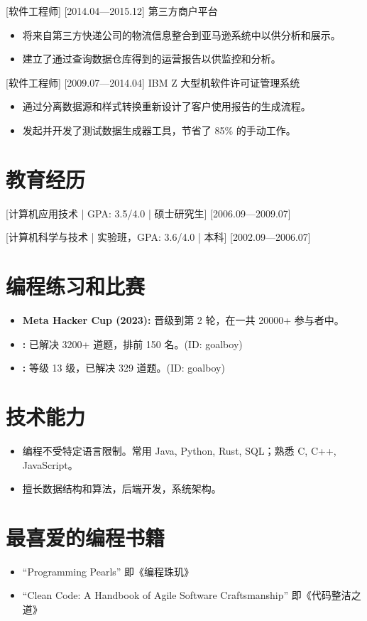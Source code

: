 \documentclass{resume}
\begin{document}
[软件工程师]
[2014.04—2015.12]
第三方商户平台
\begin{itemize}
  \item 将来自第三方快递公司的物流信息整合到亚马逊系统中以供分析和展示。
  \item 建立了通过查询数据仓库得到的运营报告以供监控和分析。
\end{itemize}

[软件工程师]
[2009.07—2014.04]
IBM Z 大型机软件许可证管理系统
\begin{itemize}
  \item 通过分离数据源和样式转换重新设计了客户使用报告的生成流程。
  \item 发起并开发了测试数据生成器工具，节省了 85\% 的手动工作。
\end{itemize}

\section{教育经历}
[\textnormal{计算机应用技术 | GPA: 3.5/4.0 |} 硕士研究生]
[2006.09—2009.07]

[\textnormal{计算机科学与技术 | 实验班，GPA: 3.6/4.0 |} 本科]
[2002.09—2006.07]

\section{编程练习和比赛}
\begin{itemize}
  \item \textbf{Meta Hacker Cup (2023):} 晋级到第 2 轮，在一共 20000+ 参与者中{}。
  \item \textbf{:} 已解决 3200+ 道题，排前 150 名。(ID: goalboy)
  \item \textbf{:} 等级 13 级，已解决 329 道题。(ID: goalboy)
\end{itemize}

\section{技术能力}
\begin{itemize}
  \item 编程不受特定语言限制。常用 Java, Python, Rust, SQL；熟悉 C, C++, JavaScript。
  \item 擅长数据结构和算法，后端开发，系统架构。
\end{itemize}

\section{最喜爱的编程书籍}
\begin{itemize}
  \item ``Programming Pearls'' 即《编程珠玑》
  \item ``Clean Code: A Handbook of Agile Software Craftsmanship'' 即《代码整洁之道》
\end{itemize}
\end{document}
